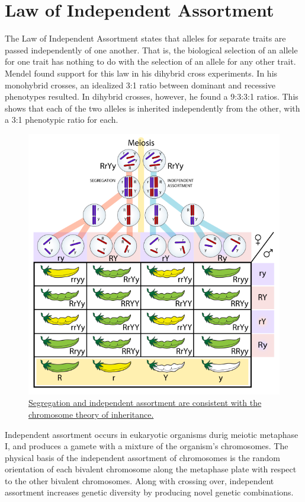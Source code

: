 \hypertarget{law-of-independent-assortment}{%
\section{Law of Independent Assortment}\label{law-of-independent-assortment}}

The Law of Independent Assortment states that alleles for separate traits are passed independently of one another. That is, the biological selection of an allele for one trait has nothing to do with the selection of an allele for any other trait. Mendel found support for this law in his dihybrid cross experiments. In his monohybrid crosses, an idealized 3:1 ratio between dominant and recessive phenotypes resulted. In dihybrid crosses, however, he found a 9:3:3:1 ratios. This shows that each of the two alleles is inherited independently from the other, with a 3:1 phenotypic ratio for each.



\begin{figure}

{\centering \includegraphics[width=0.7\linewidth]{./figures/mendel/Independent_assortment_segregation} 

}

\caption{\href{https://commons.wikimedia.org/wiki/File:Independent_assortment_\%26_segregation.svg}{Segregation and independent assortment are consistent with the chromosome theory of inheritance.}}\label{fig:assortment}
\end{figure}

Independent assortment occurs in eukaryotic organisms durig meiotic metaphase I, and produces a gamete with a mixture of the organism's chromosomes. The physical basis of the independent assortment of chromosomes is the random orientation of each bivalent chromosome along the metaphase plate with respect to the other bivalent chromosomes. Along with crossing over, independent assortment increases genetic diversity by producing novel genetic combinations.

